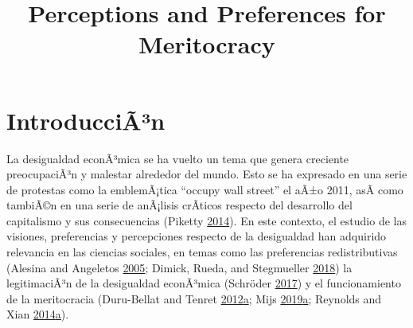 \documentclass[
]{article}
\title{Perceptions and Preferences for Meritocracy}
\date{}
\begin{document}
\maketitle

\hypertarget{introduccian}{%
\section{IntroducciÃ³n}\label{introduccian}}

La desigualdad econÃ³mica se ha vuelto un tema que genera creciente
preocupaciÃ³n y malestar alrededor del mundo. Esto se ha expresado en
una serie de protestas como la emblemÃ¡tica ``occupy wall street'' el
aÃ±o 2011, asÃ­ como tambiÃ©n en una serie de anÃ¡lisis crÃ­ticos
respecto del desarrollo del capitalismo y sus consecuencias (Piketty
\protect\hyperlink{ref-PikettyCapitalTwentyFirstCentury2014b}{2014}). En
este contexto, el estudio de las visiones, preferencias y percepciones
respecto de la desigualdad han adquirido relevancia en las ciencias
sociales, en temas como las preferencias redistributivas (Alesina and
Angeletos \protect\hyperlink{ref-alesina_Fairness_2005}{2005}; Dimick,
Rueda, and Stegmueller \protect\hyperlink{ref-dimick_Models_2018}{2018})
la legitimaciÃ³n de la desigualdad econÃ³mica (Schröder
\protect\hyperlink{ref-schroder_Income_2017}{2017}) y el funcionamiento
de la meritocracia (Duru-Bellat and Tenret
\protect\hyperlink{ref-Duru-BellatWhoMeritocracyIndividual2012b}{2012}\protect\hyperlink{ref-Duru-BellatWhoMeritocracyIndividual2012b}{a};
Mijs
\protect\hyperlink{ref-MijsParadoxInequalityIncome2019b}{2019}\protect\hyperlink{ref-MijsParadoxInequalityIncome2019b}{a};
Reynolds and Xian
\protect\hyperlink{ref-ReynoldsPerceptionsMeritocracyLand2014b}{2014}\protect\hyperlink{ref-ReynoldsPerceptionsMeritocracyLand2014b}{a}).
\end{document}
